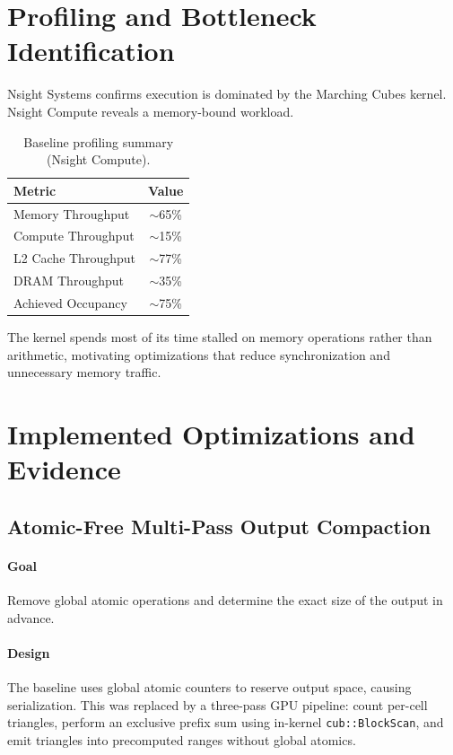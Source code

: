 \documentclass[11pt,a4paper]{article}
\begin{document}
\section{Profiling and Bottleneck Identification}

Nsight Systems confirms execution is dominated by the Marching Cubes kernel.
Nsight Compute reveals a memory-bound workload.

\begin{table}[H]
\centering
\caption{Baseline profiling summary (Nsight Compute).}
\label{tab:baseline_profiling}
\begin{tabular}{lc}
\toprule
Metric & Value \\
\midrule
Memory Throughput & $\sim$65\% \\
Compute Throughput & $\sim$15\% \\
L2 Cache Throughput & $\sim$77\% \\
DRAM Throughput & $\sim$35\% \\
Achieved Occupancy & $\sim$75\% \\
\bottomrule
\end{tabular}
\end{table}

The kernel spends most of its time stalled on memory operations rather than arithmetic, motivating optimizations that reduce synchronization and unnecessary memory traffic.

\section{Implemented Optimizations and Evidence}


\subsection{Atomic-Free Multi-Pass Output Compaction}

\paragraph{Goal}
Remove global atomic operations and determine the exact size of the output in advance.

\paragraph{Design}
The baseline uses global atomic counters to reserve output space, causing serialization. This was replaced by a three-pass GPU pipeline: count per-cell triangles, perform an exclusive prefix sum using in-kernel
\texttt{cub::BlockScan}, and emit triangles into precomputed ranges without
global atomics.
\end{document}
